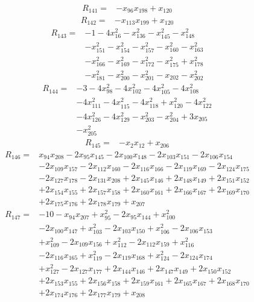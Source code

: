 \begin{align*} R_{141}={}&-x_{96}x_{198} +x_{120}
\end{align*}
\begin{align*} R_{142}={}&-x_{113}x_{199} +x_{120}
\end{align*}
\begin{align*} R_{143}={}&-1 -4 x_{16}^{2} -x_{136}^{2} -x_{145}^{2} -x_{148}^{2}
\\ &-x_{151}^{2} -x_{154}^{2} -x_{157}^{2} -x_{160}^{2} -x_{163}^{2}
\\ &-x_{166}^{2} -x_{169}^{2} -x_{172}^{2} -x_{175}^{2} +x_{178}^{2}
\\ &-x_{181}^{2} -x_{200}^{2} -x_{201}^{2} -x_{202} -x_{202}^{2}
\end{align*}
\begin{align*} R_{144}={}&-3 -4 x_{98}^{2} -4 x_{102}^{2} -4 x_{105}^{2} -4 x_{108}^{2}
\\ &-4 x_{111}^{2} -4 x_{115}^{2} -4 x_{118}^{2} +x_{120}^{2} -4 x_{122}^{2}
\\ &-4 x_{126}^{2} -4 x_{129}^{2} -x_{203}^{2} -x_{204}^{2} +3 x_{205}
\\ &-x_{205}^{2}
\end{align*}
\begin{align*} R_{145}={}&-x_{2}x_{12} +x_{206}
\end{align*}
\begin{align*} R_{146}={}&x_{94}x_{208} -2 x_{95}x_{145} -2 x_{100}x_{148} -2 x_{103}x_{151} -2 x_{106}x_{154}
\\ &-2 x_{109}x_{157} -2 x_{112}x_{160} -2 x_{116}x_{166} -2 x_{119}x_{169} -2 x_{124}x_{175}
\\ &-2 x_{127}x_{178} -2 x_{131}x_{208} +2 x_{145}x_{146} +2 x_{148}x_{149} +2 x_{151}x_{152}
\\ &+2 x_{154}x_{155} +2 x_{157}x_{158} +2 x_{160}x_{161} +2 x_{166}x_{167} +2 x_{169}x_{170}
\\ &+2 x_{175}x_{176} +2 x_{178}x_{179} +x_{207}
\end{align*}
\begin{align*} R_{147}={}&-10 -x_{94}x_{207} +x_{95}^{2} -2 x_{95}x_{144} +x_{100}^{2}
\\ &-2 x_{100}x_{147} +x_{103}^{2} -2 x_{103}x_{150} +x_{106}^{2} -2 x_{106}x_{153}
\\ &+x_{109}^{2} -2 x_{109}x_{156} +x_{112}^{2} -2 x_{112}x_{159} +x_{116}^{2}
\\ &-2 x_{116}x_{165} +x_{119}^{2} -2 x_{119}x_{168} +x_{124}^{2} -2 x_{124}x_{174}
\\ &+x_{127}^{2} -2 x_{127}x_{177} +2 x_{144}x_{146} +2 x_{147}x_{149} +2 x_{150}x_{152}
\\ &+2 x_{153}x_{155} +2 x_{156}x_{158} +2 x_{159}x_{161} +2 x_{165}x_{167} +2 x_{168}x_{170}
\\ &+2 x_{174}x_{176} +2 x_{177}x_{179} +x_{208}
\end{align*}
